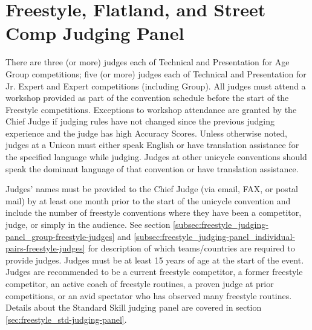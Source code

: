 \section{Freestyle, Flatland, and Street Comp Judging Panel \label{sec:freestyle_judging-panel}}
There are three (or more) judges each of Technical and Presentation for Age Group competitions; five (or more) judges each of Technical and Presentation for Jr. Expert and Expert competitions (including Group).
All judges must attend a workshop provided as part of the convention schedule before the start of the Freestyle competitions.
Exceptions to workshop attendance are granted by the Chief Judge if judging rules have not changed since the previous judging experience and the judge has high Accuracy Scores.
Unless otherwise noted, judges at a Unicon must either speak English or have translation assistance for the specified language while judging.
Judges at other unicycle conventions should speak the dominant language of that convention or have translation assistance.

Judges' names must be provided to the Chief Judge (via email, FAX, or postal mail) by at least one month prior to the start of the unicycle convention and include the number of freestyle conventions where they have been a competitor, judge, or simply in the audience.
See section \ref{subsec:freestyle_judging-panel_group-freestyle-judges} and \ref{subsec:freestyle_judging-panel_individual-pairs-freestyle-judges} for description of which teams/countries are required to provide judges.
Judges must be at least 15 years of age at the start of the event.
Judges are recommended to be a current freestyle competitor, a former freestyle competitor, an active coach of freestyle routines, a proven judge at prior competitions, or an avid spectator who has observed many freestyle routines.
Details about the Standard Skill judging panel are covered in section \ref{sec:freestyle_std-judging-panel}.

